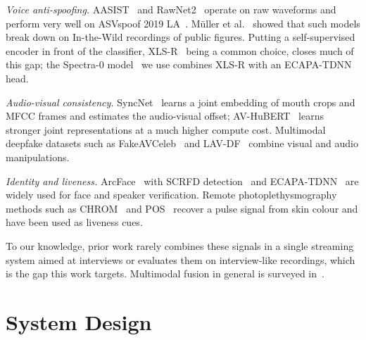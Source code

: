 \documentclass[conference]{IEEEtran}
\begin{document}
\textit{Voice anti-spoofing.} AASIST~\cite{jung2022aasist} and RawNet2~\cite{tak2021rawnet2} operate on raw
waveforms and perform very well on ASVspoof 2019 LA~\cite{wang2020asvspoof}. M\"uller et al.~\cite{muller2022itw}
showed that such models break down on In-the-Wild recordings of public figures. Putting a self-supervised
encoder in front of the classifier, XLS-R~\cite{babu2022xlsr} being a common choice, closes much of this gap; the Spectra-0
model~\cite{spectra0} we use combines XLS-R with an ECAPA-TDNN head.

\textit{Audio-visual consistency.} SyncNet~\cite{chung2016syncnet} learns a joint embedding of mouth crops and
MFCC frames and estimates the audio-visual offset; AV-HuBERT~\cite{shi2022avhubert} learns stronger joint
representations at a much higher compute cost. Multimodal deepfake datasets such as
FakeAVCeleb~\cite{khalid2021fakeavceleb} and LAV-DF~\cite{cai2022lavdf} combine visual and audio manipulations.

\textit{Identity and liveness.} ArcFace~\cite{deng2019arcface} with SCRFD detection~\cite{guo2022scrfd} and
ECAPA-TDNN~\cite{desplanques2020ecapa} are widely used for face and speaker verification. Remote
photoplethysmography methods such as CHROM~\cite{dehaan2013chrom} and POS~\cite{wang2017pos} recover a pulse
signal from skin colour and have been used as liveness cues.

To our knowledge, prior work rarely combines these signals in a single streaming system aimed at interviews or
evaluates them on interview-like recordings, which is the gap this work targets. Multimodal fusion in general is
surveyed in~\cite{baltrusaitis2019multimodal}.

\section{System Design}
\end{document}
